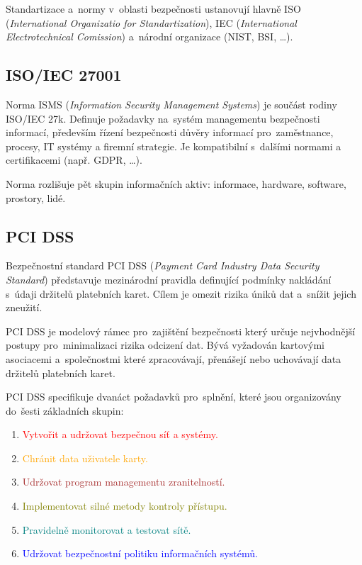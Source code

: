Standartizace a~normy v~oblasti bezpečnosti ustanovují hlavně
ISO (\emph{International Organizatio for Standartization}),
IEC (\emph{International Electrotechnical Comission}) a~národní organizace (NIST, BSI, \dots).


\subsection{ISO/IEC 27001}

Norma ISMS (\emph{Information Security Management Systems}) je součást rodiny ISO/IEC 27k.
Definuje požadavky na~systém managementu bezpečnosti informací, především řízení bezpečnosti důvěry informací pro~zaměstnance, procesy, IT systémy a firemní strategie.
Je kompatibilní s~dalšími normami a certifikacemi (např. GDPR, \dots).

Norma rozlišuje pět skupin informačních aktiv: informace, hardware, software, prostory, lidé.


\subsection{PCI DSS}

Bezpečnostní standard PCI DSS (\emph{Payment Card Industry Data Security Standard}) představuje mezinárodní pravidla definující podmínky nakládání s~údaji držitelů platebních karet.
Cílem je omezit rizika úniků dat a~snížit jejich zneužití.

PCI DSS je modelový rámec pro~zajištění bezpečnosti který určuje nejvhodnější postupy pro~minimalizaci rizika odcizení dat.
Bývá vyžadován kartovými asociacemi a~společnostmi které zpracovávají, přenášejí nebo uchovávají data držitelů platebních karet.

PCI DSS specifikuje dvanáct požadavků pro~splnění, které jsou organizovány do~šesti základních skupin:
\vspace*{-0.5em}\begin{enumerate}
\item \textcolor{red}{Vytvořit a udržovat bezpečnou síť a systémy.}
\item \textcolor{orange}{Chránit data uživatele karty.}
\item \textcolor{brown}{Udržovat program managementu zranitelností.}
\item \textcolor{olive}{Implementovat silné metody kontroly přístupu.}
\item \textcolor{teal}{Pravidelně monitorovat a testovat sítě.}
\item \textcolor{blue}{Udržovat bezpečnostní politiku informačních systémů.}
\end{enumerate}

